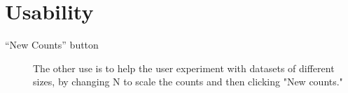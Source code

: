 \documentclass[11pt,letterpaper]{article}
\begin{document}
\section{Usability}
\begin{description}
\item[``New Counts'' button] The other use is to help the user experiment with datasets of different sizes, by changing N to scale the counts and then clicking "New counts."
\end{description}


\end{document}
